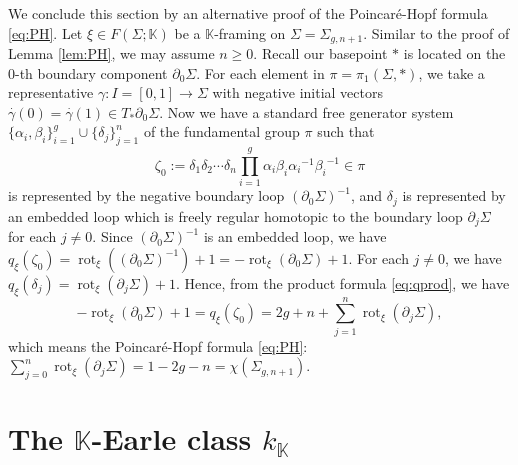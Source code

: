 \documentclass[a4paper,12pt, twoside]{amsart}
\theoremstyle{definition}
\theoremstyle{remark}
\numberwithin{equation}{section}
\newcommand\bK{{\mathbb{K}}}
\newcommand\inv{^{-1}}
\newcommand\pa{\partial}
\newcommand\rot{\operatorname{rot}}
\begin{document}
We conclude this section by an alternative proof of the Poincar\'e-Hopf formula \eqref{eq:PH}. Let $\xi \in F(\Sigma; \bK)$ be a $\bK$-framing on $\Sigma = \Sigma_{g,n+1}$. Similar to the proof of Lemma \ref{lem:PH}, we may assume $n \geq 0$. Recall our basepoint $\ast$ is located on the $0$-th boundary component $\pa_0\Sigma$.
For each element in $\pi = \pi_1(\Sigma, *)$, we take a representative $\gamma: I = [0,1] \to \Sigma$ with negative initial vectors $\overset\cdot\gamma(0) = \overset\cdot\gamma(1) \in T_*\pa_0\Sigma$. 
Now we have a standard free generator system $\{\alpha_i, \beta_i\}^g_{i=1}\cup \{\delta_j\}^n_{j=1}$ of the fundamental group $\pi$ such that 
$$
\zeta_0 := \delta_1\delta_2\cdots \delta_n\prod^g_{i=1}\alpha_i\beta_i{\alpha_i}\inv {\beta_i}\inv \in\pi
$$
is represented by the negative boundary loop $(\pa_0\Sigma)\inv$, and $\delta_j$ is represented by an embedded loop which is freely regular homotopic to the boundary loop $\pa_j\Sigma$ for each $j \neq 0$. 
Since $(\pa_0\Sigma)\inv$ is an embedded loop, we have $q_\xi(\zeta_0) = \rot_\xi((\pa_0\Sigma)\inv) + 1 = -\rot_\xi(\pa_0\Sigma) + 1$. 
For each $j \neq 0$, we have $q_\xi(\delta_j) = \rot_\xi(\pa_j\Sigma) + 1$. 
Hence, from the product formula \eqref{eq:qprod}, we have 
$$
-\rot_\xi(\pa_0\Sigma) + 1 = q_\xi(\zeta_0) 
= 2g + n + \sum^n_{j=1}\rot_\xi(\pa_j\Sigma),
$$
which means the Poincar\'e-Hopf formula \eqref{eq:PH}: $\sum^n_{j=0}\rot_\xi(\pa_j\Sigma) = 1- 2g - n = \chi(\Sigma_{g,n+1})$.
\par

\section{The $\bK$-Earle class $k_\bK$}\label{sec:k}
\end{document}
